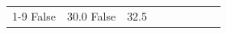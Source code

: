 \begin{table}[H]
\begin{tabular}{lllrlllll}
\cline{1-9}
False & 30.0%
\cline{1-9}
False & 32.5%

\end{tabular}
\end{table}
